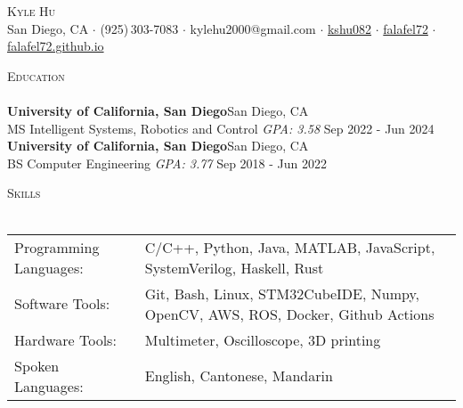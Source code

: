 \documentclass[a4paper]{article}
\newcommand{\lineunder} {
    \vspace*{-8pt} \\
    \hspace*{-18pt} \hrulefill \\
}
\newcommand{\header} [1] {
    {\hspace*{-18pt}\vspace*{6pt} \textsc{#1}}
    \vspace*{-6pt} \lineunder
}
\begin{document}
\vspace*{-40pt}

    

\vspace*{-10pt}
\begin{center}
	{\Huge \scshape {Kyle Hu}}\\
  \vspace{2mm}
	\faGlobe\:San Diego, CA
  $\cdot$ \faPhone\:(925)\,303-7083
  $\cdot$ \faEnvelope\:kylehu2000@gmail.com
  $\cdot$ \faLinkedinSquare\:\href{https://www.linkedin.com/in/kshu082/}{kshu082}
  $\cdot$ \faGithubSquare\:\href{https://www.github.com/falafel72}{falafel72}
  $\cdot$ \faChain\:\href{https://falafel72.github.io}{falafel72.github.io}\\
\end{center}

\begin{comment}
\header{Objective}
Looking for an entry-level full time job where I can fully utilize my
robotics education and systems experience.
\vspace{1mm}
\end{comment}
\header{Education}
\vspace{1mm}
\textbf{University of California, San Diego}\hfill San Diego, CA\\
MS Intelligent Systems, Robotics and Control \textit{GPA: 3.58} \hfill Sep 2022 - Jun 2024\\
\vspace{2mm}
\textbf{University of California, San Diego}\hfill San Diego, CA\\
BS Computer Engineering \textit{GPA: 3.77} \hfill Sep 2018 - Jun 2022\\
\vspace{2mm}

\header{Skills}
\vspace{2mm}
\begin{tabular}{ l l }
	Programming Languages: & C/C++, Python, Java, MATLAB, JavaScript, SystemVerilog, Haskell, Rust  \\
	Software Tools:       & Git, Bash, Linux, STM32CubeIDE, Numpy, OpenCV, AWS, ROS, Docker, Github Actions \\
  Hardware Tools: & Multimeter, Oscilloscope, 3D printing \\
	Spoken Languages:      & English, Cantonese, Mandarin                     \\
\end{tabular}
\vspace{2mm}
\end{document}
